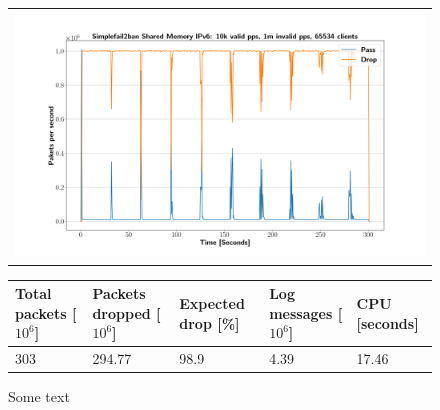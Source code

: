 \begin{figure}[p]
	\label{fig:simplefail2ban:shm:ip6:1m}
	\centering
	\scriptsize
	\begin{tabular}{c}
    	\centerline{\includegraphics[width=1.2\textwidth]{images/simplefail2ban_shm_ipv6_v10k_iv1m_c65534.png}}
	\end{tabular}
	\begin{tabular}{lllll}
		\toprule
		\textbf{Total packets [$10^6$]} & \textbf{Packets dropped [$10^6$]} & \textbf{Expected drop [\%]} & \textbf{Log messages [$10^6$]} & \textbf{CPU [seconds]} \\ \midrule 
		303 & 294.77 & 98.9 & 4.39 & 17.46 \\
		\bottomrule
	\end{tabular}
	\caption[Simplefail2ban Shared Memory IPv6 1m PPS]{Some text}
\end{figure}

